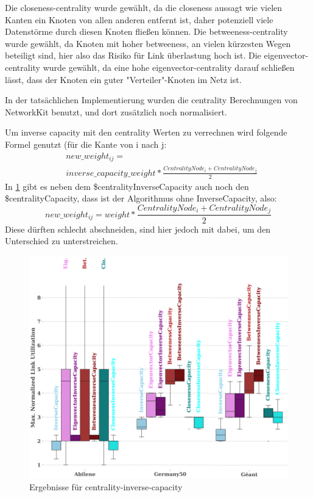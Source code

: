 \documentclass[sigconf, nonacm, review]{acmart}
\begin{document}
Die closeness-centrality wurde gew\"ahlt, da die closeness aussagt wie vielen Kanten ein Knoten von allen anderen entfernt ist, daher potenziell viele Datenst\"orme durch diesen Knoten flie\ss en k\"onnen.
Die betweeness-centrality wurde gew\"ahlt, da Knoten mit hoher betweeness, an vielen k\"urzesten Wegen beteiligt sind, hier also das Risiko f\"ur Link \"uberlastung hoch ist.
Die eigenvector-centrality wurde gew\"ahlt, da eine hohe eigenvector-centrality darauf schlie\ss en l\"asst, dass der Knoten ein guter "Verteiler"-Knoten im Netz ist.

In der tats\"achlichen Implementierung wurden die centrality Berechnungen von NetworkKit benutzt, und dort zus\"atzlich noch normalisiert.

Um inverse capacity mit den centrality Werten zu verrechnen wird folgende Formel genutzt (f\"ur die Kante von i nach j:
\begin{align*}
&new\_weight_{ij} =\\
&inverse\_capacity\_weight * \frac{CentralityNode_i + CentralityNode_j}{2}
\end{align*}
In \ref{fig:kai_p1_results} gibt es neben dem \$centralityInverseCapacity auch noch den \$centralityCapacity, dass ist der Algorithmus ohne InverseCapacity, also:
\[
new\_weight_{ij} = weight * \frac{CentralityNode_i + CentralityNode_j}{2}
\]
Diese d\"urften schlecht abschneiden, sind hier jedoch mit dabei, um den Unterschied zu unterstreichen.


\begin{figure}
\centering
\includegraphics[width=\linewidth]{figures/kai_p1_results.png}
\caption{Ergebnisse f\"ur centrality-inverse-capacity}
\label{fig:kai_p1_results}
\end{figure}
\end{document}

